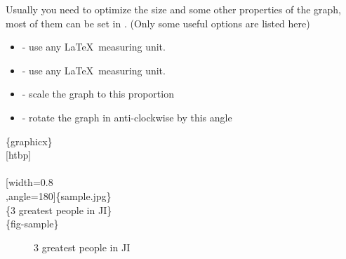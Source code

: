 \begin{frame}
	Usually you need to optimize the size and some other properties of the graph, most of them can be set in . (Only some useful options are listed here)
	\begin{itemize}
		\item {} - use any \LaTeX\ measuring unit.
		\item {} - use any \LaTeX\ measuring unit.
		\item {} - scale the graph to this proportion
		\item {} - rotate the graph in anti-clockwise by this angle 
	\end{itemize}
	\begin{minipage}{0.5\linewidth}
		\begin{example}
			\{graphicx\}\\
			[htbp]\\
			\qquad {}\\
			\qquad {}[width=0.8\\
			,angle=180]\{sample.jpg\}\\
			\qquad {}\{3 greatest people in JI\}\\
			\qquad {}\{fig-sample\}\\
		\end{example}
	\end{minipage}
	\hfill
	\begin{minipage}{0.45\linewidth}
		\begin{figure}[htbp]
			\centering
			\caption{3 greatest people in JI}
			\label{fig-sample}		
		\end{figure}
	\end{minipage}
\end{frame}


